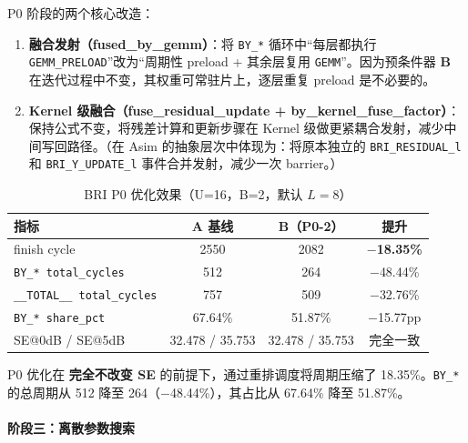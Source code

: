 \documentclass{CjC}
\begin{document}
    P0 阶段的两个核心改造：

    \begin{enumerate}
        \item \textbf{融合发射（fused\_by\_gemm）}：将 \texttt{BY\_*}
            循环中“每层都执行 \texttt{GEMM\_PRELOAD}”改为“周期性 preload +
            其余层复用 \texttt{GEMM}”。因为预条件器 $\bm{B}$
            在迭代过程中不变，其权重可常驻片上，逐层重复 preload 是不必要的。

        \item \textbf{Kernel 级融合（fuse\_residual\_update + by\_kernel\_fuse\_factor）}：保持公式不变，将残差计算和更新步骤在
            Kernel 级做更紧耦合发射，减少中间写回路径。（在 Asim 的抽象层次中体现为：将原本独立的
            \texttt{BRI\_RESIDUAL\_l} 和 \texttt{BRI\_Y\_UPDATE\_l} 事件合并发射，减少一次
            barrier。）
    \end{enumerate}

    \begin{table}[H]
        \centering
        \caption{BRI P0 优化效果（U=16，B=2，默认 $L=8$）}
        \begin{tabular}{l c c c}
            \toprule \textbf{指标}                 & \textbf{A 基线}   & \textbf{B（P0-2）} & \textbf{提升}         \\
            \midrule finish cycle                & 2550            & 2082             & \textbf{$-$18.35\%} \\
            \texttt{BY\_* total\_cycles}         & 512             & 264              & $-$48.44\%          \\
            \texttt{\_\_TOTAL\_\_ total\_cycles} & 757             & 509              & $-$32.76\%          \\
            \texttt{BY\_* share\_pct}            & 67.64\%         & 51.87\%          & $-$15.77pp          \\
            SE@0dB / SE@5dB                      & 32.478 / 35.753 & 32.478 / 35.753  & 完全一致                \\
            \bottomrule
        \end{tabular}
    \end{table}

    P0 优化在 \textbf{完全不改变 SE} 的前提下，通过重排调度将周期压缩了 18.35\%。\texttt{BY\_*}
    的总周期从 512 降至 264（$-$48.44\%），其占比从 67.64\% 降至 51.87\%。

    \paragraph{阶段三：离散参数搜索}
\end{document}
